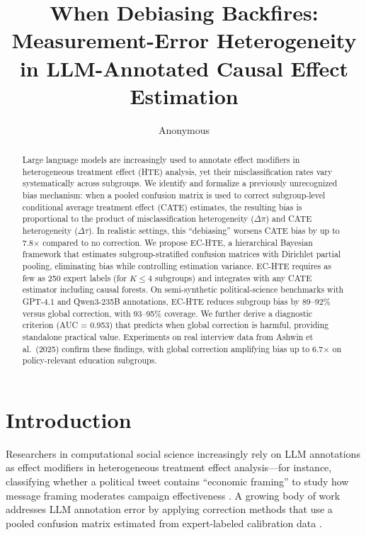 \documentclass[11pt,a4paper]{article}
\title{When Debiasing Backfires: Measurement-Error Heterogeneity\\ in LLM-Annotated Causal Effect Estimation}
\author{Anonymous}
\begin{document}
\maketitle

\begin{abstract}
Large language models are increasingly used to annotate effect modifiers in heterogeneous treatment effect (HTE) analysis, yet their misclassification rates vary systematically across subgroups. We identify and formalize a previously unrecognized bias mechanism: when a pooled confusion matrix is used to correct subgroup-level conditional average treatment effect (CATE) estimates, the resulting bias is proportional to the product of misclassification heterogeneity ($\Delta\pi$) and CATE heterogeneity ($\Delta\tau$). In realistic settings, this ``debiasing'' worsens CATE bias by up to 7.8$\times$ compared to no correction. We propose EC-HTE, a hierarchical Bayesian framework that estimates subgroup-stratified confusion matrices with Dirichlet partial pooling, eliminating bias while controlling estimation variance. EC-HTE requires as few as 250 expert labels (for $K \le 4$ subgroups) and integrates with any CATE estimator including causal forests. On semi-synthetic political-science benchmarks with GPT-4.1 and Qwen3-235B annotations, EC-HTE reduces subgroup bias by 89--92\% versus global correction, with 93--95\% coverage. We further derive a diagnostic criterion (AUC = 0.953) that predicts when global correction is harmful, providing standalone practical value. Experiments on real interview data from Ashwin et al.\ (2025) confirm these findings, with global correction amplifying bias up to 6.7$\times$ on policy-relevant education subgroups.
\end{abstract}

\section{Introduction}

Researchers in computational social science increasingly rely on LLM annotations as effect modifiers in heterogeneous treatment effect analysis---for instance, classifying whether a political tweet contains ``economic framing'' to study how message framing moderates campaign effectiveness \citep{egami2024dsl,angelopoulos2023ppi}. A growing body of work addresses LLM annotation error by applying correction methods that use a pooled confusion matrix estimated from expert-labeled calibration data \citep{angelopoulos2023ppi,egami2024dsl,mozer2026arm}.
\end{document}
